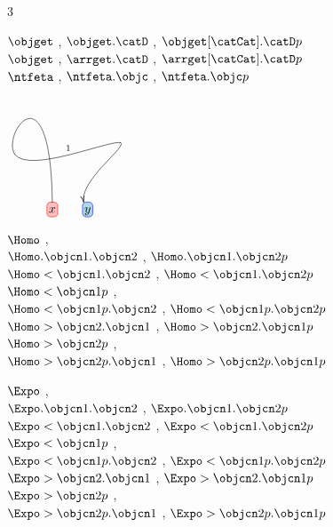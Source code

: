 \begin{multicols*}{3}
\vspace{10pt}

$\objget$ , $\objget.{\catD}$ , $\objget[\catCat].{\catD}p$ \\
$\objget$ , $\arrget.{\catD}$ , $\arrget[\catCat].{\catD}p$ \\
$\ntfeta$ , $\ntfeta.\objc$ , $\ntfeta.\objc p$

\vspace{10pt}

$\begin{xy}
( 0,0)*+<3pt>[F-:<3pt>:red][F*:<3pt>:pink]{\vphantom{fg}x}="x",
(10,0)*+<3pt>[F-:<3pt>:blue][F*:<3pt>:LightBlue]{\vphantom{fg}y}="y";
"x",
{\ar@`{
  "x"+/u+10pc/,
  "x"+/l+7pc/,
  "y"+/ur+10pc/,
  "y"+/ul+2pc/
}^{1},"y"},
\end{xy}$

\vfill\null\columnbreak

$\Homo$ , \\
$\Homo.{\objcn1}.{\objcn2}$  , $\Homo.{\objcn1}.{\objcn2}p$   \\
$\Homo<{\objcn1}.{\objcn2}$  , $\Homo<{\objcn1}.{\objcn2}p$   \\
$\Homo<{\objcn1}p$           ,                                  \\
$\Homo<{\objcn1}p.{\objcn2}$ , $\Homo<{\objcn1}p.{\objcn2}p$  \\
$\Homo>{\objcn2}.{\objcn1}$  , $\Homo>{\objcn2}.{\objcn1}p$   \\
$\Homo>{\objcn2}p$           ,                                  \\
$\Homo>{\objcn2}p.{\objcn1}$ , $\Homo>{\objcn2}p.{\objcn1}p$ 

\vspace{10pt}

$\Expo$ , \\
$\Expo.{\objcn1}.{\objcn2}$ , $\Expo.{\objcn1}.{\objcn2}p$   \\
$\Expo<{\objcn1}.{\objcn2}$ , $\Expo<{\objcn1}.{\objcn2}p$   \\
$\Expo<{\objcn1}p$ ,                                           \\
$\Expo<{\objcn1}p.{\objcn2}$ , $\Expo<{\objcn1}p.{\objcn2}p$ \\
$\Expo>{\objcn2}.{\objcn1}$ , $\Expo>{\objcn2}.{\objcn1}p$   \\
$\Expo>{\objcn2}p$ ,                                           \\
$\Expo>{\objcn2}p.{\objcn1}$ , $\Expo>{\objcn2}p.{\objcn1}p$ 

\end{multicols*}

